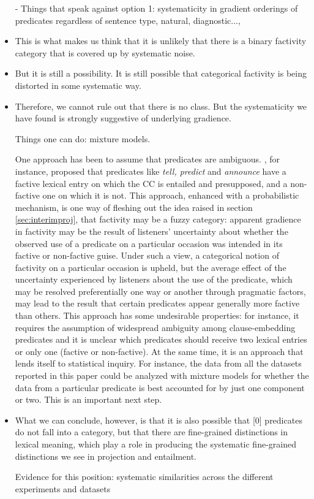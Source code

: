 \documentclass[11pt,fleqn]{article}
\newcommand{\6}{\mbox{$[\hspace*{-.6mm}[$}}
\newcommand{\9}{\mbox{$]\hspace*{-.6mm}]$}}
\begin{document}
\begin{itemize}
- Things that speak against option 1: systematicity in gradient orderings of predicates regardless of sentence type, natural, diagnostic...,

\item This is what makes us think that it is unlikely that there is a binary factivity category that is covered up by systematic noise.

\item But it is still a possibility. It is still possible that categorical factivity is being distorted in some systematic way.  

\item Therefore, we cannot rule out that there is no class. But the systematicity we have found is strongly suggestive of underlying gradience.

Things one can do: mixture models.

One approach has been to assume that predicates are ambiguous. \citet[1736]{spector-egre2015}, for instance, proposed that predicates like {\em tell, predict} and {\em announce}  have a factive lexical entry on which the CC is entailed and presupposed, and a non-factive one on which it is not. This approach, enhanced with a probabilistic mechanism, is one way of fleshing out the idea raised in section \ref{sec:interimproj}, that factivity may be a fuzzy category: apparent gradience in factivity may be the result of listeners' uncertainty about whether the observed use of a predicate on a particular occasion was intended in its factive or non-factive guise. Under such a view, a categorical notion of factivity on a particular occasion is upheld, but the average effect of the uncertainty experienced by listeners about the use of the predicate, which may be resolved preferentially one way or another through pragmatic factors, may lead to the result that certain predicates appear generally more factive than others.  This approach has some undesirable properties: for instance, it requires the assumption of widespread ambiguity among clause-embedding predicates and it is unclear which predicates should receive two lexical entries or only one (factive or non-factive). At the same time, it is an approach that lends itself to statistical inquiry. For instance, the data from all the datasets reported in this paper could be analyzed with mixture models for whether the data from a particular predicate is best accounted for by just one component or two. This is an important next step. 

\item What we can conclude, however, is that it is also possible that [0] predicates do not fall into a category, but that there are fine-grained distinctions in lexical meaning, which play a role in producing the systematic fine-grained distinctions we see in projection and entailment.

Evidence for this position: systematic similarities across the different experiments and datasets

\end{itemize}
\end{document}
